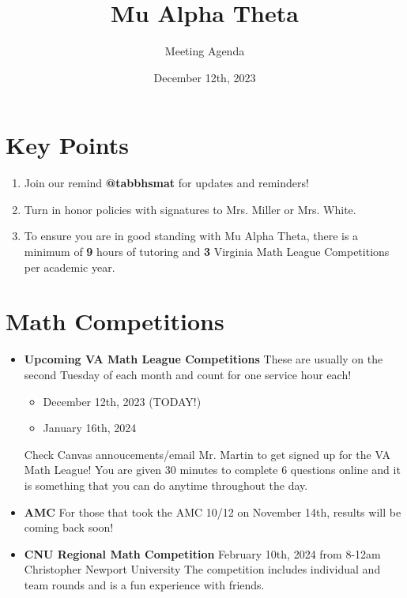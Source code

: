 \documentclass[11pt]{article}
\author{Meeting Agenda}
\title{Mu Alpha Theta}
\date{December 12th, 2023}
\begin{document}
  \maketitle

  \section{Key Points}
    \begin{enumerate}
        \item Join our remind \textbf{@tabbhsmat} for updates and reminders!
        \item Turn in honor policies with signatures to Mrs. Miller or Mrs. White.
        \item To ensure you are in good standing with Mu Alpha Theta, there is a minimum of \textbf{9} hours of tutoring and \textbf{3} Virginia Math League Competitions per academic year.
    \end{enumerate}
  \section{Math Competitions} 
    \begin{itemize}
        \item \textbf{Upcoming VA Math League Competitions} \newline
        These are usually on the second Tuesday of each month and count for one service hour each!
            \begin{itemize}
                \item December 12th, 2023 (TODAY!)
                \item January 16th, 2024
            \end{itemize}
            Check Canvas annoucements/email Mr. Martin to get signed up for the VA Math League! You are given 30 minutes to complete 6 questions online and it is something that you can do anytime throughout the day. 
        \item \textbf{AMC} \newline
        For those that took the AMC 10/12 on November 14th, results will be coming back soon! 
        \item \textbf{CNU Regional Math Competition} \newline
        February 10th, 2024 from 8-12am \newline
        Christopher Newport University \newline
        The competition includes individual and team rounds and is a fun experience with friends.
    \end{itemize}
    
\end{document}
